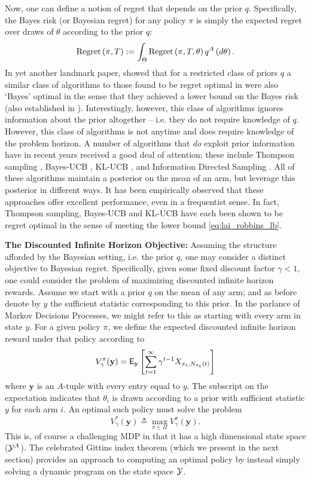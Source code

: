 Now, one can define a notion of regret that depends on the prior $q$. Specifically, the Bayes risk (or Bayesian regret) for any policy $\pi$ is simply the expected regret over draws of $\theta$ according to the prior $q$:
\[
\textnormal{Regret} \left( \pi, T \right) := \int_\Theta \textnormal{Regret} \left( \pi, T, \theta \right) q^A\left(d\theta\right).
\]
In yet another landmark paper, \cite{lai1987adaptive} showed that for a restricted class of priors $q$ a similar class of algorithms to those found to be regret optimal in \citep{lai1985asymptotically} were {\color{blue} also `Bayes' optimal in the sense that they achieved a lower bound on the Bayes risk (also established in \cite{lai1987adaptive})}. Interestingly, however, this class of algorithms ignores information about the prior altogether -- i.e. they do not require knowledge of $q$.
However, this class of algorithms is not anytime and does require knowledge of the problem horizon.
A number of algorithms that {\em do} exploit prior information have in recent years received a good deal of attention; these include Thompson sampling \citep{thompson1933likelihood}, Bayes-UCB \citep{kaufmann2012thompson}, KL-UCB \citep{garivier2011kl}, and Information Directed Sampling \citep{russo2014learning}. All of these algorithms maintain a posterior on the mean of an arm, but leverage this posterior in different ways. It has been empirically observed that these approaches offer excellent performance, even in a frequentist sense. In fact, Thompson sampling, Bayes-UCB and KL-UCB have each been shown to be regret optimal in the sense of meeting the lower bound  \eqref{eq:lai_robbins_lb}. 
 
\noindent\textbf{\textsf{The Discounted Infinite Horizon Objective: }}Assuming the structure afforded by the Bayesian setting, i.e. the prior $q$, one may consider a distinct objective to Bayesian regret. Specifically, given some fixed discount factor $\gamma < 1$, one could consider the problem of maximizing discounted infinite horizon rewards. Assume we start with a prior $q$ on the mean of any arm; and as before denote by $y$ the sufficient statistic corresponding to this prior. In the parlance of Markov Decisions Processes, we might refer to this as starting with every arm in state $y$. For a given policy $\pi$, we define the expected discounted infinite horizon reward under that policy according to
\[
V^\pi_\gamma(\mathbf{y}) 
=
\mathsf{E}_{\mathbf{y}}
\left[
	\sum_{t=1}^\infty \gamma^{t-1} X_{\pi_t,N_{\pi_t}(t)}
\right]
\]
where $\mathbf{y}$ is an $A$-tuple with every entry equal to $y$. The subscript on the expectation indicates that $\theta_i$ is drawn according to a prior with sufficient statistic $y$ for each arm $i$. An optimal such policy must solve the problem
\[
V^*_\gamma(\mathbf{y}) 
\triangleq 
\max_{\pi \in \Pi} V^\pi_\gamma(\mathbf{y}). 
\]
This is, of course a challenging MDP in that it has a high dimensional state space ($\mathcal Y^A$). The celebrated Gittins index theorem (which we present in the next section) provides an approach to computing an optimal policy by instead simply solving a dynamic program on the state space $\mathcal Y$. 


